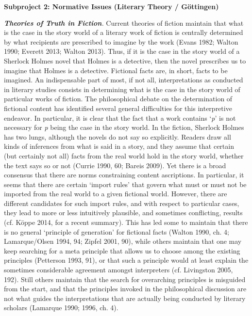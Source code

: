 
\vspace{.2cm}
\noindent\textbf{Subproject 2: Normative Issues (Literary Theory / G\"ottingen)}
\vspace{.2cm}

\noindent\textbf{\emph{Theories of Truth in Fiction}}\emph{.} Current theories of
fiction maintain that what is the case in the story world of a literary
work of fiction is centrally determined by what recipients are
prescribed to imagine by the work (Evans 1982; Walton 1990; Everett
2013; Walton 2013). Thus, if it is the case in the story world of a
Sherlock Holmes novel that Holmes is a detective, then the novel
prescribes us to imagine that Holmes is a detective. Fictional facts
are, in short, facts to be imagined. An indispensable part of most, if
not all, interpretations as conducted in literary studies consists in
determining what is the case in the story world of particular works of
fiction. The philosophical debate on the determination of fictional
content has identified several general difficulties for this
interpretive endeavor. In particular, it is clear that the fact that a
work contains `\emph{p}' is not necessary for \emph{p} being the case in
the story world. In the fiction, Sherlock Holmes has two lungs, although
the novels do not say so explicitly. Readers draw all kinds of
inferences from what is said in a story, and they assume that certain
(but certainly not all) facts from the real world hold in the story
world, whether the text says so or not (Currie 1990, 60; Bareis 2009).
Yet there is a broad consensus that there are norms constraining content
ascriptions. In particular, it seems that there are certain `import
rules' that govern what must or must not be imported from the real world
to a given fictional world. However, there are different candidates for
such import rules, and with respect to particular cases, they lead to
more or less intuitively plausible, and sometimes conflicting, results
(cf. K\"oppe 2014, for a recent summary). This has led some to maintain
that there is no general `principle of generation' for fictional facts
(Walton 1990, ch. 4; Lamarque/Olsen 1994, 94; Zipfel 2001, 90), while
others maintain that one may keep searching for a meta principle that
allows us to choose among the existing principles (Petterson 1993, 91),
or that such a principle would at least explain the sometimes
considerable agreement amongst interpreters (cf. Livingston 2005, 192).
Still others maintain that the search for overarching principles is
misguided from the start, and that the principles invoked in the
philosophical discussion are not what guides the interpretations that
are actually being conducted by literary scholars (Lamarque 1990; 1996,
ch. 4).

